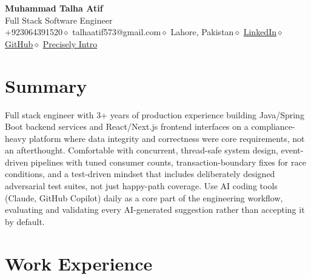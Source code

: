 \documentclass[10pt, letterpaper]{article}
\begin{document}
\pagestyle{empty}

\begin{center}
  {\Large\bfseries\color{navy} Muhammad Talha Atif}\\[4pt]
  {\normalsize\color{medgray} Full Stack Software Engineer}\\[4pt]
  {\small\color{lightgray}
    +923064391520\enspace$\diamond$\enspace
    talhaatif573@gmail.com\enspace$\diamond$\enspace
    Lahore, Pakistan\enspace$\diamond$\enspace
    \href{https://linkedin.com/in/muhammad-talha-atif}{LinkedIn}\enspace$\diamond$\enspace
    \href{https://github.com/M-Talha-Atif}{GitHub}\enspace$\diamond$\enspace
    \href{https://talha-atif.vercel.app/r/precisely}{Precisely Intro}}
\end{center}

\vspace{2pt}

\section{Summary}

Full stack engineer with 3+ years of production experience building Java/Spring Boot backend
services and React/Next.js frontend interfaces on a compliance-heavy platform where data
integrity and correctness were core requirements, not an afterthought. Comfortable with
concurrent, thread-safe system design, event-driven pipelines with tuned consumer counts,
transaction-boundary fixes for race conditions, and a test-driven mindset that includes
deliberately designed adversarial test suites, not just happy-path coverage. Use AI coding
tools (Claude, GitHub Copilot) daily as a core part of the engineering workflow, evaluating and
validating every AI-generated suggestion rather than accepting it by default.

\section{Work Experience}
\end{document}
